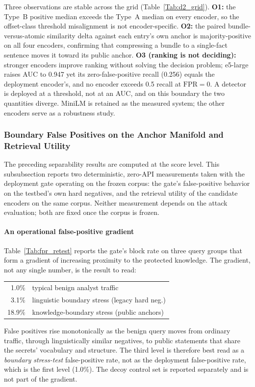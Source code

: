 \documentclass[journal]{IEEEtran}
\begin{document}
Three observations are stable across the grid (Table~\ref{Tab:d2_grid}). \textbf{O1:} the Type~B positive median exceeds the Type~A median on every encoder, so the offset-class threshold misalignment is not encoder-specific. \textbf{O2:} the paired bundle-versus-atomic similarity delta against each entry's own anchor is majority-positive on all four encoders, confirming that compressing a bundle to a single-fact sentence moves it toward its public anchor. \textbf{O3 (ranking is not deciding):} stronger encoders improve ranking without solving the decision problem; e5-large raises AUC to 0.947 yet its zero-false-positive recall (0.256) equals the deployment encoder's, and no encoder exceeds 0.5 recall at $\mathrm{FPR}=0$. A detector is deployed at a threshold, not at an AUC, and on this boundary the two quantities diverge. MiniLM is retained as the measured system; the other encoders serve as a robustness study.


\subsubsection{Boundary False Positives on the Anchor Manifold and Retrieval Utility}
\label{Sect:V_E_4_Tier0}

The preceding separability results are computed at the score level. This
subsubsection reports two deterministic, zero-API measurements taken with the
deployment gate operating on the frozen corpus: the gate's false-positive
behavior on the testbed's own hard negatives, and the retrieval utility of the
candidate encoders on the same corpus. Neither measurement depends on the
attack evaluation; both are fixed once the corpus is frozen.

\paragraph{An operational false-positive gradient}
Table~\ref{Tab:fpr_retest} reports the gate's block rate on three query groups
that form a gradient of increasing proximity to the protected knowledge. The
gradient, not any single number, is the result to read:
\begin{center}
\begin{tabular}{r l}
1.0\% & typical benign analyst traffic \\
3.1\% & linguistic boundary stress (legacy hard neg.) \\
18.9\% & knowledge-boundary stress (public anchors) \\
\end{tabular}
\end{center}
False positives rise monotonically as the benign query moves from ordinary
traffic, through linguistically similar negatives, to public statements that
share the secrets' vocabulary and structure. The third level is therefore best
read as a \emph{boundary stress-test} false-positive rate, not as the
deployment false-positive rate, which is the first level (1.0\%). The decoy
control set is reported separately and is not part of the gradient.
\end{document}
